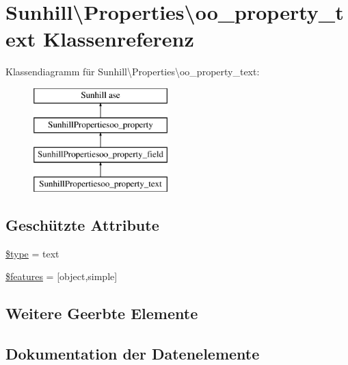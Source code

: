 \hypertarget{classSunhill_1_1Properties_1_1oo__property__text}{}\section{Sunhill\textbackslash{}Properties\textbackslash{}oo\+\_\+property\+\_\+text Klassenreferenz}
\label{classSunhill_1_1Properties_1_1oo__property__text}
Klassendiagramm für Sunhill\textbackslash{}Properties\textbackslash{}oo\+\_\+property\+\_\+text\+:\begin{figure}[H]
\begin{center}
\leavevmode
\includegraphics[height=4.000000cm]{d6/d8b/classSunhill_1_1Properties_1_1oo__property__text}
\end{center}
\end{figure}
\subsection*{Geschützte Attribute}
\begin{DoxyCompactItemize}
\item 
\hyperlink{classSunhill_1_1Properties_1_1oo__property__text_ac1abfec82049d1ebaecdf2403c89c414}{\$type} = \textquotesingle{}text\textquotesingle{}
\item 
\hyperlink{classSunhill_1_1Properties_1_1oo__property__text_a182e0269b9bbdcefb7200c600088c0f5}{\$features} = \mbox{[}\textquotesingle{}object\textquotesingle{},\textquotesingle{}simple\textquotesingle{}\mbox{]}
\end{DoxyCompactItemize}
\subsection*{Weitere Geerbte Elemente}


\subsection{Dokumentation der Datenelemente}
\mbox{\label{classSunhill_1_1Properties_1_1oo__property__text_a182e0269b9bbdcefb7200c600088c0f5}} 
